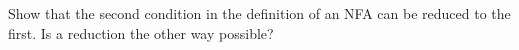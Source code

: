 Show that the second condition in the definition of an NFA
can be reduced to the first. Is a reduction the other way possible?
